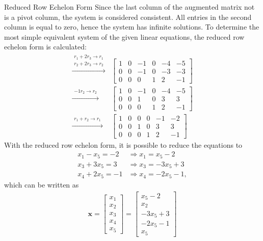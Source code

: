 \begin{example}{Reduced Row Echelon Form}
Since the last column of the augmented matrix not is a pivot column, the system is considered consistent. All entries in the second column is equal to zero, hence the system has infinite solutions. 
To determine the most simple equivalent system of the given linear equations, the reduced row echelon form is calculated:
\begin{align*}
  \xrightarrow{\substack{r_1+2r_3\rightarrow r_1\\r_2+2r_3\rightarrow r_2}}
    &\begin{bmatrix}
  	    1 & 0 & -1 &0 & -4 & -5 \\
 	    0 & 0 & -1 & 0 & -3 & -3 \\
	    0 & 0 & 0 & 1 & 2 & -1
     \end{bmatrix}\\
  \xrightarrow{\substack{-1r_2\rightarrow r_2}}
  &\begin{bmatrix}
  	    1 & 0 & -1 &0 & -4 & -5 \\
 	    0 & 0 & 1 & 0 & 3 & 3 \\
	    0 & 0 & 0 & 1 & 2 & -1
     \end{bmatrix}\\
     \xrightarrow{\substack{r_1+r_2\rightarrow r_1}}
     &\begin{bmatrix}
        1 & 0 & 0 & 0 &-1 &-2 \\
 	    0 & 0 & 1 & 0 & 3 & 3 \\
	    0 & 0 & 0 & 1 & 2 &-1
     \end{bmatrix}
    \end{align*}
With the reduced row echelon form, it is possible to reduce the equations to
	\begin{align*}
		x_1-x_5 =-2   &\Rightarrow x_1=x_5 -2\\
        x_3 + 3x_5 =3 &\Rightarrow x_3=-3x_5+3\\
        x_4 +2x_5 = -1 &\Rightarrow	x_4=-2x_5-1,
	\end{align*}
which can be written as
    \begin{align*}
    	\textbf{x}=
        \begin{bmatrix}
       	    x_1\\ x_2 \\ x_3\\ x_4 \\x_5
        \end{bmatrix} =
        \begin{bmatrix}
        	x_5- 2\\ x_2\\ -3x_5 +3\\-2x_5-1\\ x_5 

\end{bmatrix}
\end{align*}
\end{example}
